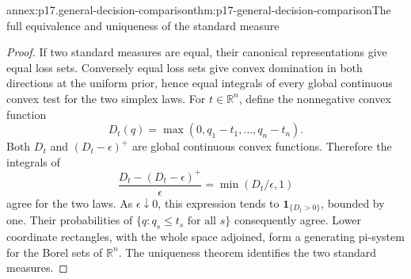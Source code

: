 \begin{annexitem}{annex:p17.general-decision-comparison}{thm:p17-general-decision-comparison}{The full equivalence and uniqueness of the standard measure}
\begin{proof}
If two standard measures are equal, their canonical representations
give equal loss sets. Conversely equal loss sets give convex domination
in both directions at the uniform prior, hence equal integrals of every
global continuous convex test for the two simplex laws.
For \(t\in\mathbb R^n\), define the nonnegative convex function
\[
                       D_t(q)=\max(0,q_1-t_1,\ldots,q_n-t_n).
\]
Both \(D_t\) and \((D_t-\epsilon)^+\) are global continuous convex
functions. Therefore the integrals of
\[
       \frac{D_t-(D_t-\epsilon)^+}{\epsilon}
                            =\min(D_t/\epsilon,1)
\]
agree for the two laws. As \(\epsilon\downarrow0\), this expression
tends to \(\mathbf1_{\{D_t>0\}}\), bounded by one.
Their probabilities of
\(\{q:q_s\leq t_s\text{ for all }s\}\) consequently agree.
Lower coordinate rectangles, with the whole space adjoined, form a
generating pi-system for the Borel sets of \(\mathbb R^n\).
The uniqueness theorem identifies the two standard measures.
\end{proof}
\end{annexitem}

